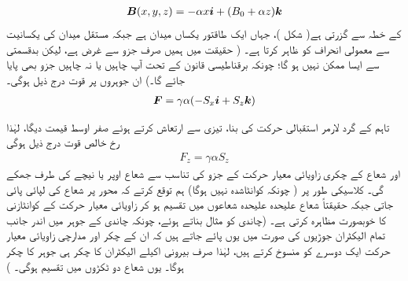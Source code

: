 \begin{align}
{\ensuremath{{\boldsymbol{B}}}} (x, y, z) = - \alpha x {\boldsymbol{i}} + (B_0 + \alpha z) {\boldsymbol{k}}
\end{align}
کے خطہ سے گزرتی ہے( شکل  )، جہاں  ایک طاقتور یکساں میدان ہے جبکہ مستقل  میدان کی یکسانیت سے معمولی انحراف کو ظاہر کرتا ہے۔ ( حقیقت میں ہمیں صرف  جزو سے غرض ہے، لیکن بدقسمتی سے ایسا ممکن نہیں ہو گا؛ چونکہ برقناطیسی قانون  کے تحت آپ چاہیں یا نہ چاہیں  جزو بھی پایا جائے گا۔) ان جوہروں پر قوت درج ذیل ہوگی۔
\begin{align*}
{\ensuremath{{\boldsymbol{F}}}} = \gamma \alpha (- S_x {\boldsymbol{i}} + S_z {\boldsymbol{k}})
\end{align*}

 تاہم  کے گرد لارمر استقبالی حرکت کی بنا،  تیزی سے ارتعاش کرتے ہوئے صفر اوسط قیمت دیگا، لہٰذا  رخ خالص قوت درج ذیل ہوگی 
\begin{align}\label{مساوات_تین_ابعادی_کونٹائی_زیڈ_قوت}
F_z = \gamma \alpha S_z
\end{align}
اور شعاع کے چکری زاویائی معیار حرکت کے  جزو کی تناسب سے شعاع اوپر یا نیچے کی طرف جھکے گی۔ کلاسیکی طور پر ( چونکہ  کوانٹاشدہ نہیں ہوگا) ہم توقع کرتے کہ  محور پر شعاع کی لپائی پائی جاتی جبکہ حقیقتاً شعاع  علیحدہ علیحدہ شعاعوں میں تقسیم ہو کر زاویائی معیار حرکت کے کوانٹازنی کا خوبصورت مظاہرہ کرتی ہے۔ (چاندی کو مثال بناتے ہوئے، چونکہ چاندی کے جوہر میں اندر جانب تمام الیکٹران جوڑیوں کی صورت میں یوں پائے جاتے ہیں کہ ان کے چکر اور مدارچی زاویائی معیار حرکت ایک دوسرے کو منسوخ کرتے ہیں، لہٰذا صرف بیرونی اکیلے الیکٹران کا چکر  ہی جوہر کا چکر ہوگا۔ یوں شعاع دو ٹکڑوں میں تقسیم ہوگی۔ )

